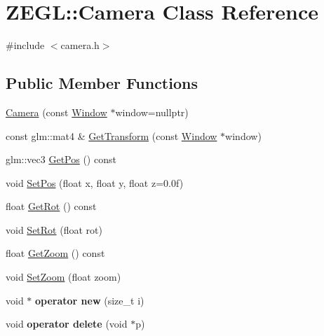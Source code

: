 \hypertarget{class_z_e_g_l_1_1_camera}{}\section{Z\+E\+G\+L\+:\+:Camera Class Reference}
\label{class_z_e_g_l_1_1_camera}


{\ttfamily \#include $<$camera.\+h$>$}

\subsection*{Public Member Functions}
\begin{DoxyCompactItemize}
\item 
\hyperlink{class_z_e_g_l_1_1_camera_afe162528fc9249f540aa772c0d1c22c9}{Camera} (const \hyperlink{class_z_e_g_l_1_1_window}{Window} $\ast$window=nullptr)
\item 
const glm\+::mat4 \& \hyperlink{class_z_e_g_l_1_1_camera_ad39df4bd961d2debd682f87f657f9614}{Get\+Transform} (const \hyperlink{class_z_e_g_l_1_1_window}{Window} $\ast$window)
\item 
glm\+::vec3 \hyperlink{class_z_e_g_l_1_1_camera_a0dbdf23ce58ffee1a5a7fcfe7672f1cc}{Get\+Pos} () const 
\item 
void \hyperlink{class_z_e_g_l_1_1_camera_a3e4d6e95cf1c0357937de4b515f88b6b}{Set\+Pos} (float x, float y, float z=0.\+0f)
\item 
float \hyperlink{class_z_e_g_l_1_1_camera_adda8a25f5ba68c3dba29334659a66652}{Get\+Rot} () const 
\item 
void \hyperlink{class_z_e_g_l_1_1_camera_a1c44b901139b76428955637d7eeb000b}{Set\+Rot} (float rot)
\item 
float \hyperlink{class_z_e_g_l_1_1_camera_ae90bbfb4a99f096269973a524a3697d8}{Get\+Zoom} () const 
\item 
void \hyperlink{class_z_e_g_l_1_1_camera_ac487ced7703cdedce8d7b3041cc580d7}{Set\+Zoom} (float zoom)
\item 
\hypertarget{class_z_e_g_l_1_1_camera_a635568a1202e5f39b71b8270e747daae}{}void $\ast$ {\bfseries operator new} (size\+\_\+t i)\label{class_z_e_g_l_1_1_camera_a635568a1202e5f39b71b8270e747daae}

\item 
\hypertarget{class_z_e_g_l_1_1_camera_ab70a6518d82b2cb86163642c27cd6436}{}void {\bfseries operator delete} (void $\ast$p)\label{class_z_e_g_l_1_1_camera_ab70a6518d82b2cb86163642c27cd6436}

\end{DoxyCompactItemize}


